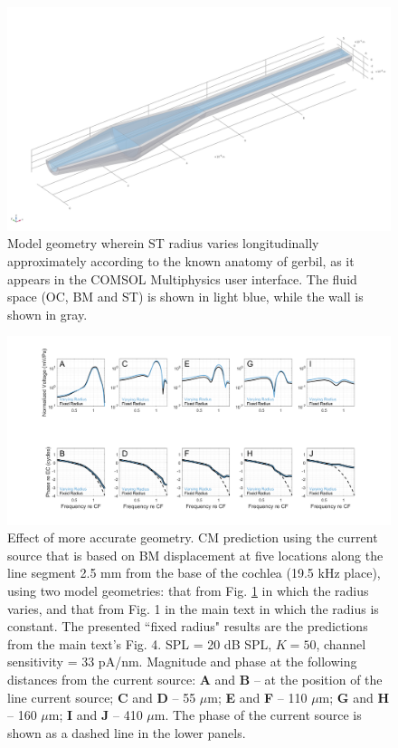 \documentclass{article}
\begin{document}
\clearpage

\begin{figure}[h]
\centering
\includegraphics[width = \textwidth]{final_figures/conegeometry.png}
\caption{  {Model geometry wherein ST radius varies longitudinally approximately according to the known anatomy of gerbil, as it appears in the COMSOL Multiphysics user interface. The fluid space (OC, BM and ST) is shown in light blue, while the wall is shown in gray.}}
\label{geometry2}
\end{figure}

\begin{figure}[h]
\centering
\includegraphics[width = \textwidth]{final_figures/comp geometry.png}
\caption{  {Effect of more accurate geometry.  CM prediction using the current source that is based on BM displacement at five locations along the line segment 2.5 mm from the base of the cochlea (19.5 kHz place), using two model geometries: that from Fig. \ref{geometry2} in which the radius varies, and that from Fig. 1 in the main text  in which the radius is constant. The presented ``fixed radius" results are the predictions from the main text's Fig. 4. SPL = 20 dB SPL, $K=50$, channel sensitivity = 33 pA/nm. Magnitude and phase at the following distances from the current source: \textbf{A} and \textbf{B} -- at the position of the line current source; \textbf{C} and \textbf{D} -- 55 $\mu$m; \textbf{E} and \textbf{F} -- 110 $\mu$m; \textbf{G} and \textbf{H} -- 160 $\mu$m; \textbf{I} and \textbf{J} -- 410 $\mu$m.  The phase of the current source is shown as a dashed line in the lower panels.}}
\label{varyR}
\end{figure}
\end{document}
